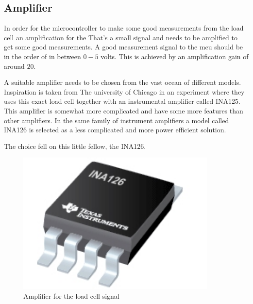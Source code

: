 \subsection{Amplifier}


In order for the microcontroller to make some good measurements from the load cell an amplification for the  
That’s a small signal and needs to be amplified to get some good measurements. A good measurement signal to the \gls{mcu} should be in the order of in between $0 - 5$ volts. 
This is achieved by an amplification gain of around $20$. 


A suitable amplifier needs to be chosen from the vast ocean of different models. Inspiration is taken from The university of Chicago\cite{UoC} in an experiment where they uses this exact load cell together with an instrumental amplifier called INA125. This amplifier is somewhat more complicated and have some more features than other amplifiers. %
In the same family of instrument amplifiers a model called INA126 is selected as a less complicated and more power efficient solution.


The choice fell on this little fellow, the INA126. %

\begin{figure}[H]%
\begin{center}
	\includegraphics[width = 10cm]{Figures/INA126.png}
	\caption{Amplifier for the load cell signal}
	\label{INA126}
\end{center}
\end{figure}


